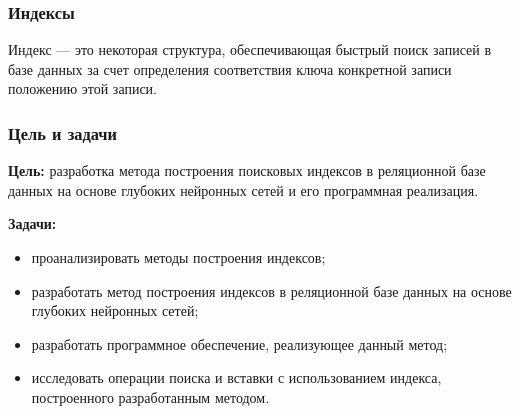 \documentclass[8pt]{bmstu-pr}
\begin{document}


\begin{frame}
    \fontsize{22pt}{22pt}\selectfont
    \frametitle{Индексы}

    \parbox[t]{\linewidth}{
        Индекс --- это некоторая структура, обеспечивающая быстрый \mbox{поиск}
        записей в базе данных за счет определения соответствия ключа
        \mbox{конкретной} записи положению этой записи.
    }

    \vspace{0.5cm}
    \begin{minipage}{0.50\textwidth}
    \end{minipage} \hfill
    \begin{minipage}{0.45\textwidth}
    \end{minipage}

\end{frame}

\begin{frame}
    \frametitle{Цель и задачи}

    {
    \fontsize{22pt}{22pt}\selectfont
    \parbox[t]{\linewidth}{
        \textbf{Цель:} разработка метода построения поисковых индексов в
        \mbox{реляционной} базе данных на основе глубоких нейронных сетей и его
        программная реализация.
    }

    \vspace{10mm}
    \parbox[t]{\linewidth}{
        \textbf{Задачи:}
        \begin{itemize}
            \item проанализировать методы построения индексов;
            \item разработать метод построения индексов в реляционной базе
                \mbox{данных} на основе глубоких нейронных сетей;
            \item разработать программное обеспечение, реализующее данный
                \mbox{метод};
            \item исследовать операции поиска и вставки с использованием
                \mbox{индекса}, построенного разработанным методом.
        \end{itemize}
    }
    }
\end{frame}
\end{document}
